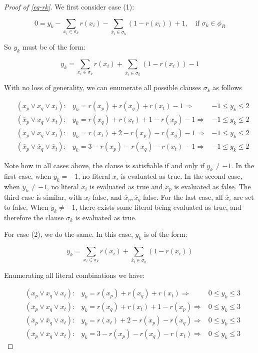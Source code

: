 \documentclass{amsart}
\newcommand{\ov}{\overline}
\theoremstyle{plain}
\renewcommand{\implies}{\Rightarrow}
\begin{document}
\begin{proof}[Proof of \autoref{eq-rk}]
  We first consider case (1):

  \begin{equation*}
    0 = y_k-\sum_{x_i\in\sigma_k} r(x_i)-\sum_{\ov{x}_i\in\sigma_k} (1-r(x_i))+1,\quad\text{if }
    \sigma_k\in\phi_R
  \end{equation*}

  So $y_k$ must be of the form:

  \begin{equation*}
    y_k=\sum_{x_i\in\sigma_k} r(x_i)+\sum_{\ov{x}_i\in\sigma_k} (1-r(x_i))-1
  \end{equation*}

  With no loss of generality, we can enumerate all possible clauses $\sigma_k$ as follows

  \begin{align*}
    &(x_p\vee x_q\vee x_t): &y_k=r(x_p)+r(x_q)+r(x_t)-1\implies &-1\leq y_k\leq 2\\
    &(\ov{x}_p\vee x_q\vee x_t): &y_k=r(x_q)+r(x_t)+1-r(x_p)-1\implies &-1\leq y_k\leq 2\\
    &(\ov{x}_p\vee\ov{x}_q\vee x_t):&y_k=r(x_t)+2-r(x_p)-r(x_q)-1\implies &-1\leq y_k\leq 2\\
    &(\ov{x}_p\vee\ov{x}_q\vee\ov{x}_t):&y_k=3-r(x_p)-r(x_q)-r(x_t)-1\implies &-1\leq y_k\leq 2
  \end{align*}

  Note how in all cases above, the clause is satisfiable if and only if $y_k\neq -1$. In the first
  case, when $y_k=-1$, no literal $x_i$ is evaluated as true. In the second case, when $y_k\neq -1$,
  no literal $x_i$ is evaluated as true and $\ov{x}_p$ is evaluated as false. The third case is
  similar, with $x_t$ false, and $\ov{x}_p,\ov{x}_q$ false. For the last case, all $\ov{x}_i$ are
  set to false. When $y_k\neq -1$, there exists some literal being evaluated as true, and therefore
  the clause $\sigma_k$ is evaluated as true.

  For case (2), we do the same. In this case, $y_k$ is of the form:

  \begin{equation*}
    y_k=\sum_{x_i\in\sigma_k} r(x_i)+\sum_{\ov{x}_i\in\sigma_k} (1-r(x_i))
  \end{equation*}

  Enumerating all literal combinations we have:

  \begin{align*}
    &(x_p\vee x_q\vee x_t): &y_k=r(x_p)+r(x_q)+r(x_t)\implies &0\leq y_k\leq 3\\
    &(\ov{x}_p\vee x_q\vee x_t): &y_k=r(x_q)+r(x_t)+1-r(x_p)\implies &0\leq y_k\leq 3\\
    &(\ov{x}_p\vee\ov{x}_q\vee x_t):&y_k=r(x_t)+2-r(x_p)-r(x_q)\implies &0\leq y_k\leq 3\\
    &(\ov{x}_p\vee\ov{x}_q\vee\ov{x}_t):&y_k=3-r(x_p)-r(x_q)-r(x_t)\implies &0\leq y_k\leq 3
  \end{align*}


\end{proof}
\end{document}
